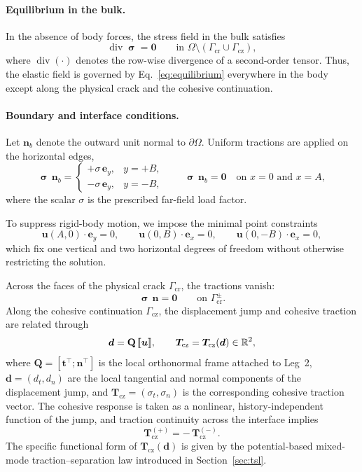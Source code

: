 \documentclass[smallextended]{svjour3}       %
\newcommand{\vb}[1]{\bm{#1}}      %
\newcommand{\mat}[1]{\mathbf{#1}}  %
\newcommand{\ex}{\vb{e}_x}
\newcommand{\ey}{\vb{e}_y}
\newcommand{\tvec}{\vb{t}}
\newcommand{\nvec}{\vb{n}}
\newcommand{\QQ}{\mat{Q}}          %
\newcommand{\uu}{\vb{u}}
\newcommand{\sig}{\bm{\upsigma}}
\DeclarePairedDelimiter{\jump}{\llbracket}{\rrbracket}
\newcommand{\diver}{\operatorname{div}}
\providecommand{\bt}{\tvec}
\renewcommand{\bt}{\tvec}
\providecommand{\bn}{\nvec}
\renewcommand{\bn}{\nvec}
\providecommand{\bd}{\vb d}
\renewcommand{\bd}{\vb d}
\providecommand{\bTcz}{\vb{T}_{\mathrm{cz}}}
\renewcommand{\bTcz}{\vb{T}_{\mathrm{cz}}}
\begin{document}
\paragraph{Equilibrium in the bulk.}
In the absence of body forces, the stress field in the bulk satisfies
\begin{equation}
	\diver\sig=\vb 0
	\qquad
	\text{in }
	\Omega\setminus(\Gamma_{\mathrm{cr}}\cup\Gamma_{\mathrm{cz}}),
	\label{eq:equilibrium}
\end{equation}
where \(\diver(\cdot)\) denotes the row-wise divergence of a second-order
tensor. Thus, the elastic field is governed by
Eq.~\eqref{eq:equilibrium} everywhere in the body except along the physical
crack and the cohesive continuation.

\paragraph{Boundary and interface conditions.}
Let \(\vb n_b\) denote the outward unit normal to \(\partial\Omega\). Uniform
tractions are applied on the horizontal edges,
\[
\sig\,\vb n_b=
\begin{cases}
	+\sigma\,\ey, & y=+B,\\[2pt]
	-\sigma\,\ey, & y=-B,
\end{cases}
\qquad
\sig\,\vb n_b=\vb 0
\quad\text{on }x=0\text{ and }x=A,
\]
where the scalar \(\sigma\) is the prescribed far-field load factor.

To suppress rigid-body motion, we impose the minimal point constraints
\[
\uu(A,0)\cdot\ey=0,
\qquad
\uu(0,B)\cdot\ex=0,
\qquad
\uu(0,-B)\cdot\ex=0,
\]
which fix one vertical and two horizontal degrees of freedom without
otherwise restricting the solution.

Across the faces of the physical crack \(\Gamma_{\mathrm{cr}}\), the
tractions vanish:
\[
\sig\,\bn=\vb 0
\qquad
\text{on }\Gamma_{\mathrm{cr}}^\pm .
\]
Along the cohesive continuation \(\Gamma_{\mathrm{cz}}\), the displacement
jump and cohesive traction are related through
\begin{equation}
	\bd=\QQ\,\jump{\uu},
	\qquad
	\bTcz=\bTcz(\bd)\in\mathbb{R}^2,
	\label{eq:cohesive_relations}
\end{equation}
where \(\QQ=[\bt^\top;\bn^\top]\) is the local orthonormal frame attached to
Leg~2, \(\bd=(d_t,d_n)\) are the local tangential and normal components of
the displacement jump, and \(\bTcz=(\sigma_t,\sigma_n)\) is the
corresponding cohesive traction vector. The cohesive response is taken as a
nonlinear, history-independent function of the jump, and traction continuity
across the interface implies
\[
\bTcz^{(+)}=-\,\bTcz^{(-)} .
\]
The specific functional form of \(\bTcz(\bd)\) is given by the
potential-based mixed-mode traction--separation law introduced in
Section~\ref{sec:tsl}.
\end{document}
